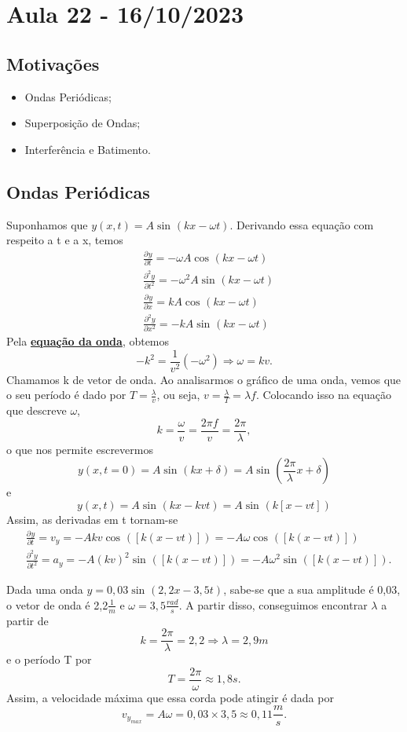 \documentclass[physicsII_notes.tex]{subfiles}
\begin{document}
\section{Aula 22 - 16/10/2023}
\subsection{Motivações}
\begin{itemize}
	\item Ondas Periódicas;
	\item Superposição de Ondas;
	\item Interferência e Batimento.
\end{itemize}
\subsection{Ondas Periódicas}
Suponhamos que \(y(x, t) = A\sin^{}{(kx - \omega t)}\). Derivando essa equação com respeito a t e a x, temos
\begin{align*}
	 & \frac{\partial^{}y}{\partial t^{}} = -\omega A \cos^{}{(kx-\omega t)}      \\
	 & \frac{\partial^{2}y}{\partial t^{2}} = -\omega^{2}A \sin^{}{(kx-\omega t)} \\
	 & \frac{\partial^{}y}{\partial x^{}} = k A \cos^{}{(kx-\omega t)}            \\
	 & \frac{\partial^{2}y}{\partial x^{2}} = -k A \sin^{}{(kx-\omega t)}
\end{align*}
Pela \hyperlink{wave_eqn}{\textbf{equação da onda}}, obtemos
\[
	-k^{2} = \frac{1}{v^{2}}(-\omega^{2}) \Rightarrow \omega = kv.
\]
Chamamos k de vetor de onda. Ao analisarmos o gráfico de uma onda, vemos que o seu período
é dado por \(T = \frac{\lambda }{v}\), ou seja, \(v = \frac{\lambda }{T} = \lambda f\). Colocando isso na equação que descreve \(\omega \),
\[
	k = \frac{\omega }{v} = \frac{2\pi f}{v} = \frac{2\pi }{\lambda },
\]
o que nos permite escrevermos
\[
	y(x, t=0) = A \sin^{}{(kx + \delta )} = A\sin^{}{(\frac{2\pi }{\lambda }x + \delta )}
\]
e
\[
	y(x, t) = A \sin^{}{(kx-kvt)} = A\sin^{}{(k[x-vt])}
\]
Assim, as derivadas em t tornam-se
\begin{align*}
	 & \frac{\partial^{}y}{\partial t^{}} = v_{y} = -Akv\cos^{}{([k(x-vt)])} = -A\omega \cos^{}{([k(x-vt)])}             \\
	 & \frac{\partial^{2}y}{\partial t^{2}} = a_{y} = -A(kv)^{2}\sin^{}{([k(x-vt)])} = -A\omega^{2}\sin^{}{([k(x-vt)])}.
\end{align*}
\begin{example}
	Dada uma onda \(y = 0,03\sin^{}{(2,2x - 3,5t)}\), sabe-se que a sua amplitude é 0,03, o vetor de onda é 2,2\(\frac{1}{m}\) e \(\omega = 3,5\frac{rad}{s}\). A partir disso,
	conseguimos encontrar \(\lambda \) a partir de
	\[
		k = \frac{2\pi }{\lambda } = 2,2 \Rightarrow \lambda = 2,9m
	\]
	e o período T por
	\[
		T = \frac{2\pi }{\omega }\approx 1,8s.
	\]
	Assim, a velocidade máxima que essa corda pode atingir é dada por
	\[
		v_{y_{max}} = A\omega = 0,03\times 3,5\approx 0,11\frac{m}{s}.
	\]
\end{example}
\end{document}
